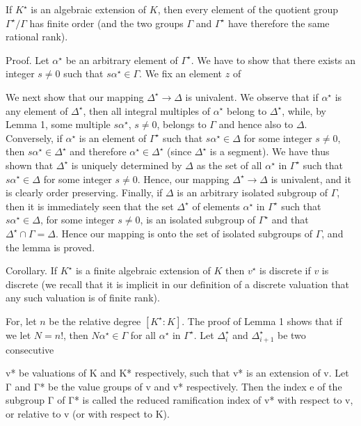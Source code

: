 If $K^\star$ is an algebraic extension of $K$, then every element of the quotient group $\Gamma^\star/\Gamma$ has finite order (and the two groups $\Gamma$ and $\Gamma^\star$ have therefore the same rational rank).

Proof. Let $\alpha^\star$ be an arbitrary element of $\Gamma^\star$. We have to show that there exists an integer $s \neq 0$ such that $s\alpha^\star \in \Gamma$. We fix an element $z$ of

We next show that our mapping $\Delta^\star \rightarrow \Delta$ is univalent. We observe that if $\alpha^\star$ is any element of $\Delta^\star$, then all integral multiples of $\alpha^\star$ belong to $\Delta^\star$, while, by Lemma 1, some multiple $s\alpha^\star$, $s \neq 0$, belongs to $\Gamma$ and hence also to $\Delta$. Conversely, if $\alpha^\star$ is an element of $\Gamma^\star$ such that $s\alpha^\star \in \Delta$ for some integer $s \neq 0$, then $s\alpha^\star \in \Delta^\star$ and therefore $\alpha^\star \in \Delta^\star$ (since $\Delta^\star$ is a segment). We have thus shown that $\Delta^\star$ is uniquely determined by $\Delta$ as the set of all $\alpha^\star$ in $\Gamma^\star$ such that $s\alpha^\star \in \Delta$ for some integer $s \neq 0$. Hence, our mapping $\Delta^\star \rightarrow \Delta$ is univalent, and it is clearly order preserving. Finally, if $\Delta$ is an arbitrary isolated subgroup of $\Gamma$, then it is immediately seen that the set $\Delta^\star$ of elements $\alpha^\star$ in $\Gamma^\star$ such that $s\alpha^\star \in \Delta$, for some integer $s \neq 0$, is an isolated subgroup of $\Gamma^\star$ and that $\Delta^\star \cap \Gamma = \Delta$. Hence our mapping is onto the set of isolated subgroups of $\Gamma$, and the lemma is proved.

Corollary. If $K^\star$ is a finite algebraic extension of $K$ then $v^\star$ is discrete if $v$ is discrete (we recall that it is implicit in our definition of a discrete valuation that any such valuation is of finite rank).

For, let $n$ be the relative degree $[K^\star:K]$. The proof of Lemma 1 shows that if we let $N=n!$, then $N\alpha^\star \in \Gamma$ for all $\alpha^\star$ in $\Gamma^\star$. Let $\Delta_i^\star$ and $\Delta_{i+1}^\star$ be two consecutive

v* be valuations of K and K* respectively, such that v* is an extension of v. Let Γ and Γ* be the value groups of v and v* respectively. Then the index e of the subgroup Γ of Γ* is called the reduced ramification index of v* with respect to v, or relative to v (or with respect to K).


